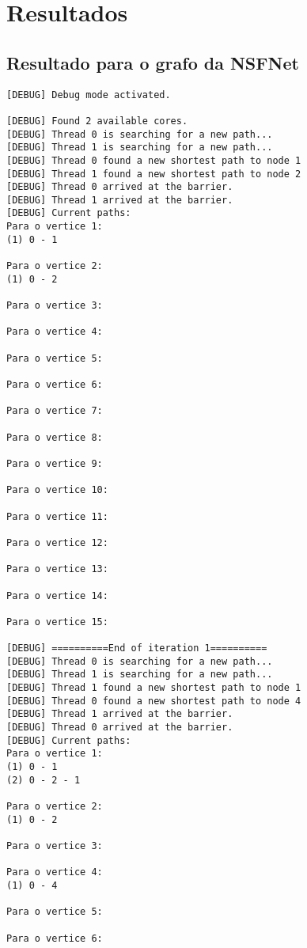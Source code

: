 \documentclass[a4paper,11pt]{article}
\begin{document}
\section{Resultados}

  \subsection{Resultado para o grafo da NSFNet}

\begin{verbatim}
[DEBUG] Debug mode activated.

[DEBUG] Found 2 available cores.
[DEBUG] Thread 0 is searching for a new path...
[DEBUG] Thread 1 is searching for a new path...
[DEBUG] Thread 0 found a new shortest path to node 1
[DEBUG] Thread 1 found a new shortest path to node 2
[DEBUG] Thread 0 arrived at the barrier.
[DEBUG] Thread 1 arrived at the barrier.
[DEBUG] Current paths:
Para o vertice 1:
(1) 0 - 1

Para o vertice 2:
(1) 0 - 2

Para o vertice 3:

Para o vertice 4:

Para o vertice 5:

Para o vertice 6:

Para o vertice 7:

Para o vertice 8:

Para o vertice 9:

Para o vertice 10:

Para o vertice 11:

Para o vertice 12:

Para o vertice 13:

Para o vertice 14:

Para o vertice 15:

[DEBUG] ==========End of iteration 1==========
[DEBUG] Thread 0 is searching for a new path...
[DEBUG] Thread 1 is searching for a new path...
[DEBUG] Thread 1 found a new shortest path to node 1
[DEBUG] Thread 0 found a new shortest path to node 4
[DEBUG] Thread 1 arrived at the barrier.
[DEBUG] Thread 0 arrived at the barrier.
[DEBUG] Current paths:
Para o vertice 1:
(1) 0 - 1
(2) 0 - 2 - 1

Para o vertice 2:
(1) 0 - 2

Para o vertice 3:

Para o vertice 4:
(1) 0 - 4

Para o vertice 5:

Para o vertice 6:


\end{verbatim}
\end{document}
